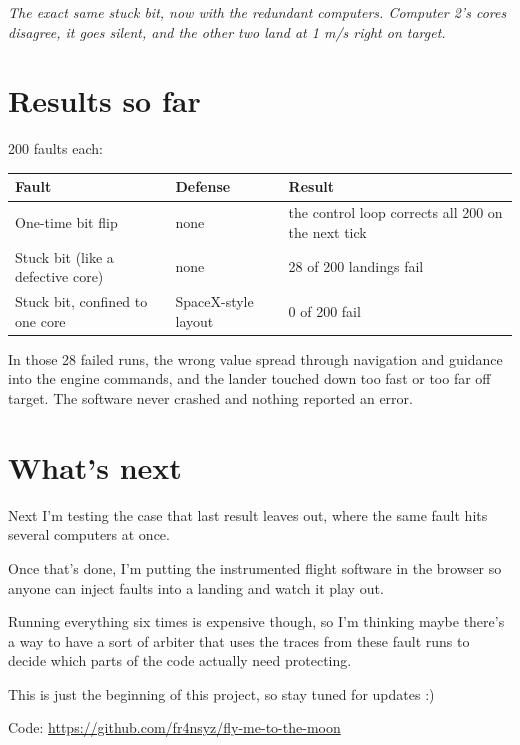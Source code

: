 \textit{The exact same stuck bit, now with the redundant computers. Computer 2's cores disagree, it goes silent, and the other two land at 1 m/s right on target.}

\section{Results so far}

200 faults each:

\begin{tabular}{|l|l|l|}
\hline
Fault & Defense & Result \\
\hline
One-time bit flip & none & the control loop corrects all 200 on the next tick \\
\hline
Stuck bit (like a defective core) & none & 28 of 200 landings fail \\
\hline
Stuck bit, confined to one core & SpaceX-style layout & 0 of 200 fail \\
\hline
\end{tabular}

In those 28 failed runs, the wrong value spread through navigation and guidance into the engine commands, and the lander touched down too fast or too far off target. The software never crashed and nothing reported an error.

\section{What's next}

Next I'm testing the case that last result leaves out, where the same fault hits several computers at once.

Once that's done, I'm putting the instrumented flight software in the browser so anyone can inject faults into a landing and watch it play out.

Running everything six times is expensive though, so I'm thinking maybe there's a way to have a sort of arbiter that uses the traces from these fault runs to decide which parts of the code actually need protecting.

This is just the beginning of this project, so stay tuned for updates :)

Code: \href{https://github.com/fr4nsyz/fly-me-to-the-moon}{https://github.com/fr4nsyz/fly-me-to-the-moon}


